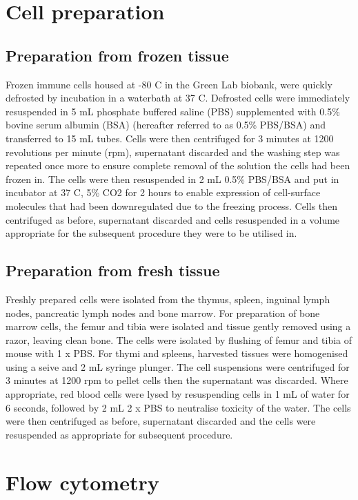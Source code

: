 \section{Cell preparation}
\label{sec:cellprep}

\subsection{Preparation from frozen tissue}

Frozen immune cells housed at -80 \textdegree C in the Green Lab biobank, were quickly defrosted by incubation in a waterbath at 37 \textdegree C.
Defrosted cells were immediately resuspended in 5 mL phosphate buffered saline (PBS) supplemented with 0.5\% bovine serum albumin (BSA) (hereafter referred to as 0.5\% PBS/BSA) and transferred to 15 mL tubes.
Cells were then centrifuged for 3 minutes at 1200 revolutions per minute (rpm), supernatant discarded and the washing step was repeated once more to ensure complete removal of the solution the cells had been frozen in.
The cells were then resuspended in 2 mL 0.5\% PBS/BSA and put in incubator at 37 \textdegree C, 5\% CO2  for 2 hours to enable expression of cell-surface molecules that had been downregulated due to the freezing process.
Cells then centrifuged as before, supernatant discarded and cells resuspended in a volume appropriate for the subsequent procedure they were to be utilised in.

\subsection{Preparation from fresh tissue}
Freshly prepared cells were isolated from the thymus, spleen, inguinal lymph nodes, pancreatic lymph nodes and bone marrow.
For preparation of bone marrow cells, the femur and tibia were isolated and tissue gently removed using a razor, leaving clean bone.
The cells were isolated by flushing of femur and tibia of mouse with 1 x PBS.
For thymi and spleens, harvested tissues were homogenised using a seive and 2 mL syringe plunger.
The cell suspensions were centrifuged for 3 minutes at 1200 rpm to pellet cells then the supernatant was discarded.
Where appropriate, red blood cells were lysed by resuspending cells in 1 mL of water for 6 seconds, followed by 2 mL 2 x PBS to neutralise toxicity of the water.
The cells were then centrifuged as before, supernatant discarded and the cells were resuspended as appropriate for subsequent procedure.

\section{Flow cytometry}

